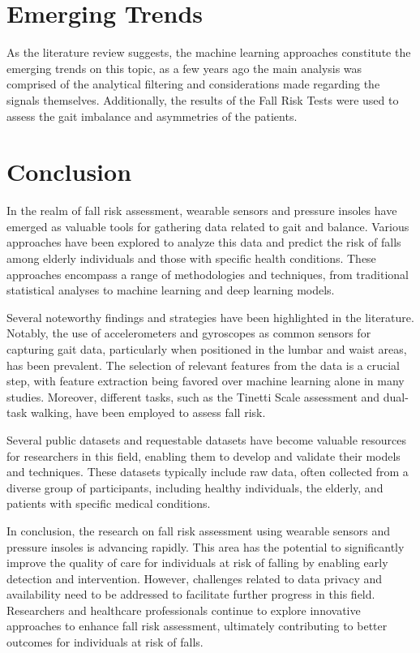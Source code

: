 \section{Emerging Trends}

As the literature review suggests, the machine learning approaches constitute the emerging trends on this topic, as a few years ago the main analysis was comprised of the analytical filtering and considerations made regarding the signals themselves. Additionally, the results of the Fall Risk Tests were used to assess the gait imbalance and asymmetries of the patients. 


\section{Conclusion}
In the realm of fall risk assessment, wearable sensors and pressure insoles have emerged as valuable tools for gathering data related to gait and balance. Various approaches have been explored to analyze this data and predict the risk of falls among elderly individuals and those with specific health conditions. These approaches encompass a range of methodologies and techniques, from traditional statistical analyses to machine learning and deep learning models.

Several noteworthy findings and strategies have been highlighted in the literature. Notably, the use of accelerometers and gyroscopes as common sensors for capturing gait data, particularly when positioned in the lumbar and waist areas, has been prevalent. The selection of relevant features from the data is a crucial step, with feature extraction being favored over machine learning alone in many studies. Moreover, different tasks, such as the Tinetti Scale assessment and dual-task walking, have been employed to assess fall risk.

Several public datasets and requestable datasets have become valuable resources for researchers in this field, enabling them to develop and validate their models and techniques. These datasets typically include raw data, often collected from a diverse group of participants, including healthy individuals, the elderly, and patients with specific medical conditions.

In conclusion, the research on fall risk assessment using wearable sensors and pressure insoles is advancing rapidly. This area has the potential to significantly improve the quality of care for individuals at risk of falling by enabling early detection and intervention. However, challenges related to data privacy and availability need to be addressed to facilitate further progress in this field. Researchers and healthcare professionals continue to explore innovative approaches to enhance fall risk assessment, ultimately contributing to better outcomes for individuals at risk of falls.